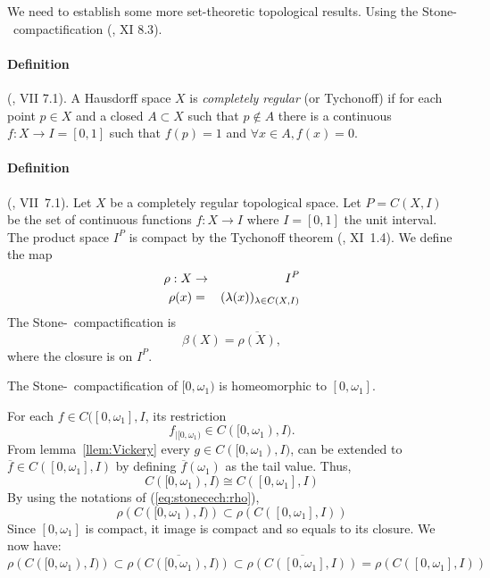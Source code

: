 We need to establish some more set-theoretic topological results.
Using the
Stone-\Cech\ compactification (\cite{Dug1966}, \textsf{XI 8.3}).

\paragraph{Definition} (\cite{Dug1966}, \textsf{VII 7.1}).
A Hausdorff space $X$ is
\emph{completely regular}
(or Tychonoff)
if for each point \(p\in X\) and a closed \(A\subset X\) such that \(p\notin A\)
there is a continuous \(f:X\rightarrow I=[0,1]\) such that \(f(p) = 1\)
and \(\forall x\in A, f(x)=0\).

\paragraph{Definition} (\cite{Dug1966}, \textsf{VII~7.1}).
Let $X$ be a completely regular topological space.
Let \(P=C(X,I)\) be the set of continuous functions \(f:X\rightarrow I\)
where \(I=[0,1]\) the unit interval. The product space \(I^P\)
is compact by the Tychonoff theorem  (\cite{Dug1966}, \textsf{XI~1.4}).
We define the map
\begin{eqnarray} \label{eq:stonecech:rho}
 \rho: X & \rightarrow & I^P \\
 \rho(x) &=& (\lambda(x))_{\lambda \in C(X,I)} \notag
\end{eqnarray}
The Stone-\Cech\ compactification is
\begin{equation*}
 \beta(X) = \overline{\rho(X)},
\end{equation*}
where the closure is on \(I^P\).

\begin{llem} \label{llem:stonecech:omega1}
The Stone-\Cech\ compactification of \([0,\omega_1)\) is homeomorphic
to \([0,\omega_1]\).
\end{llem}
\begin{thmproof}
For each \(f\in C([0,\omega_1],I\), its restriction
\begin{equation*}
 f_{|[0,\omega_1)} \in C([0,\omega_1),I).
\end{equation*}
From lemma~\ref{llem:Vickery} every \(g \in C([0,\omega_1),I)\),
can be extended to \(\overline{f}\in C([0,\omega_1],I)\)
by defining \(\overline{f}(\omega_1)\) as the tail value.
Thus,
\begin{equation*}
 C([0,\omega_1),I) \cong C([0,\omega_1],I)
\end{equation*}
By using the notations of (\ref{eq:stonecech:rho}),
\begin{equation*}
 \rho\left(C([0,\omega_1),I)\right) \subset
 \rho\left(C([0,\omega_1],I)\right)
\end{equation*}
Since \([0,\omega_1]\) is compact, it image is compact
and so equals to its closure. We now have:
\begin{equation*}
 \rho\left(C([0,\omega_1),I)\right) \subset
 \overline{\rho\left(C([0,\omega_1),I)\right)} \subset
 \overline{\rho\left(C([0,\omega_1],I)\right)} =
 \rho\left(C([0,\omega_1],I)\right)
\end{equation*}
\end{thmproof}


